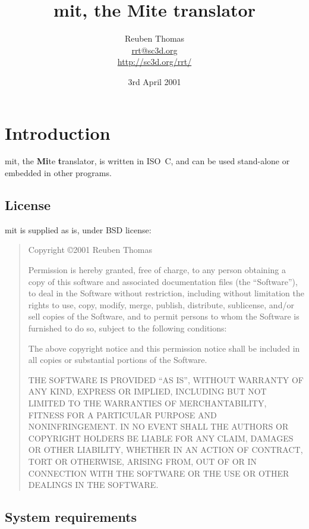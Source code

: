 \documentclass[english]{scrartcl}
\begin{document}
\title{mit, the Mite translator}
\author{Reuben Thomas\\\url{rrt@sc3d.org}\\\url{http://sc3d.org/rrt/}}
\date{3rd April 2001}
\maketitle



\section{Introduction}

mit, the \textbf{Mi}te \textbf{t}ranslator, is written in ISO~C, and can be
used stand-alone or embedded in other programs.


\subsection{License}

mit is supplied as is, under BSD license:

\begin{quote}
Copyright \copyright 2001 Reuben Thomas

Permission is hereby granted, free of charge, to any person obtaining a copy
of this software and associated documentation files (the ``Software''), to
deal in the Software without restriction, including without limitation the
rights to use, copy, modify, merge, publish, distribute, sublicense, and/or
sell copies of the Software, and to permit persons to whom the Software is
furnished to do so, subject to the following conditions:

The above copyright notice and this permission notice shall be included in
all copies or substantial portions of the Software.

THE SOFTWARE IS PROVIDED ``AS IS'', WITHOUT WARRANTY OF ANY KIND, EXPRESS OR
IMPLIED, INCLUDING BUT NOT LIMITED TO THE WARRANTIES OF MERCHANTABILITY,
FITNESS FOR A PARTICULAR PURPOSE AND NONINFRINGEMENT. IN NO EVENT SHALL THE
AUTHORS OR COPYRIGHT HOLDERS BE LIABLE FOR ANY CLAIM, DAMAGES OR OTHER
LIABILITY, WHETHER IN AN ACTION OF CONTRACT, TORT OR OTHERWISE, ARISING
FROM, OUT OF OR IN CONNECTION WITH THE SOFTWARE OR THE USE OR OTHER DEALINGS
IN THE SOFTWARE.
\end{quote}


\subsection{System requirements}
\end{document}
